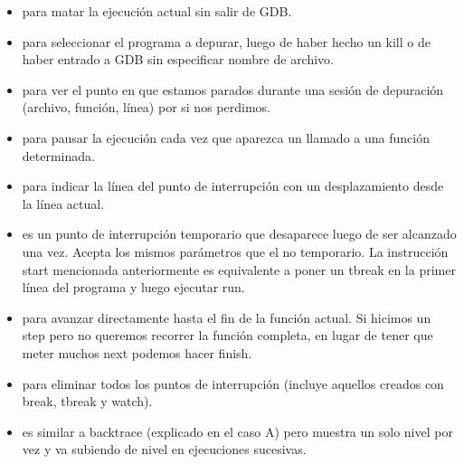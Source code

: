 
\begin{itemize}
	\item {} para matar la ejecución actual sin salir de GDB. 
	\item {} para seleccionar el programa a depurar, luego de haber hecho un kill o de haber entrado a GDB sin especificar nombre de archivo.
	\item {} para ver el punto en que estamos parados durante una sesión de depuración (archivo, función, línea) por si nos perdimos.
	\item {} para pausar la ejecución cada vez que aparezca un llamado a una función determinada.
	\item {} para indicar la línea del punto de interrupción con un desplazamiento desde la línea actual.
	\item {} es un punto de interrupción temporario que desaparece luego de ser alcanzado una vez. Acepta los mismos parámetros que el no temporario. La instrucción start mencionada anteriormente es equivalente a poner un tbreak en la primer línea del programa y luego ejecutar run.
	\item {} para avanzar directamente hasta el fin de la función actual. Si hicimos un step pero no queremos recorrer la función completa, en lugar de tener que meter muchos next podemos hacer finish.
	\item {} para eliminar todos los puntos de interrupción (incluye aquellos creados con break, tbreak y watch).
	\item {} es similar a backtrace (explicado en el caso A) pero muestra un solo nivel por vez y va subiendo de nivel en ejecuciones sucesivas.
\end{itemize}
